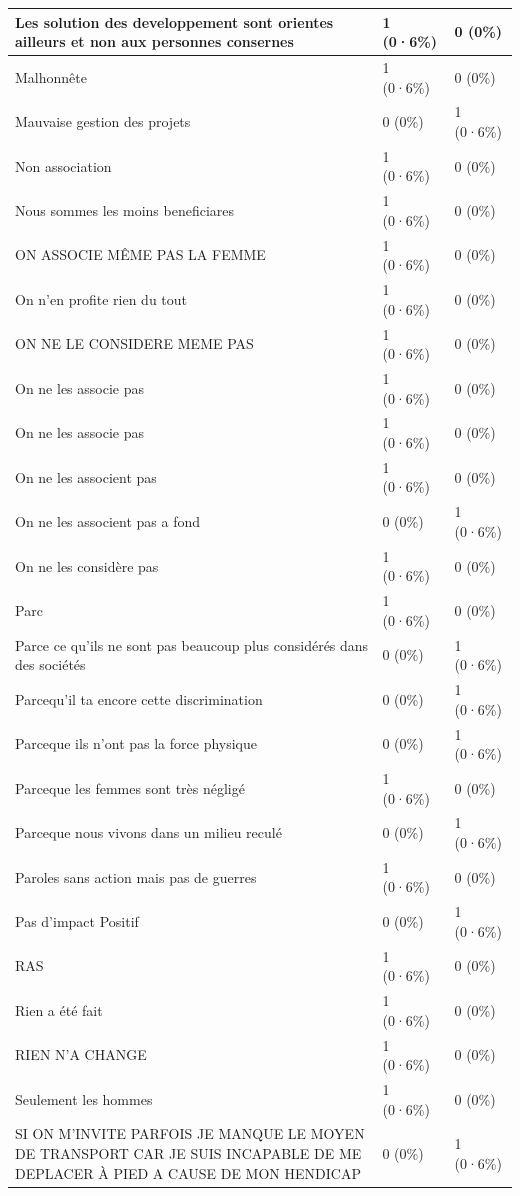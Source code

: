 \documentclass[
]{book}
\begin{document}
\begin{tabular}{l|l|l}
\hline
Les solution des developpement sont orientes ailleurs et non aux personnes consernes & 1 (0·6\%) & 0 (0\%)\\
\hline
Malhonnête & 1 (0·6\%) & 0 (0\%)\\
\hline
Mauvaise gestion des projets & 0 (0\%) & 1 (0·6\%)\\
\hline
Non association & 1 (0·6\%) & 0 (0\%)\\
\hline
Nous sommes les moins beneficiares & 1 (0·6\%) & 0 (0\%)\\
\hline
ON ASSOCIE MÊME PAS LA FEMME & 1 (0·6\%) & 0 (0\%)\\
\hline
On n'en profite rien du tout & 1 (0·6\%) & 0 (0\%)\\
\hline
ON NE LE CONSIDERE MEME PAS & 1 (0·6\%) & 0 (0\%)\\
\hline
On ne les associe  pas & 1 (0·6\%) & 0 (0\%)\\
\hline
On ne les associe pas & 1 (0·6\%) & 0 (0\%)\\
\hline
On ne les associent pas & 1 (0·6\%) & 0 (0\%)\\
\hline
On ne les associent pas a fond & 0 (0\%) & 1 (0·6\%)\\
\hline
On ne les considère pas & 1 (0·6\%) & 0 (0\%)\\
\hline
Parc & 1 (0·6\%) & 0 (0\%)\\
\hline
Parce ce qu'ils ne sont pas beaucoup plus considérés dans des sociétés & 0 (0\%) & 1 (0·6\%)\\
\hline
Parcequ'il ta encore cette discrimination & 0 (0\%) & 1 (0·6\%)\\
\hline
Parceque ils n'ont pas la force physique & 0 (0\%) & 1 (0·6\%)\\
\hline
Parceque les femmes sont très négligé & 1 (0·6\%) & 0 (0\%)\\
\hline
Parceque nous vivons dans un milieu reculé & 0 (0\%) & 1 (0·6\%)\\
\hline
Paroles sans action mais pas de guerres & 1 (0·6\%) & 0 (0\%)\\
\hline
Pas d'impact Positif & 0 (0\%) & 1 (0·6\%)\\
\hline
RAS & 1 (0·6\%) & 0 (0\%)\\
\hline
Rien a été fait & 1 (0·6\%) & 0 (0\%)\\
\hline
RIEN N'A CHANGE & 1 (0·6\%) & 0 (0\%)\\
\hline
Seulement les hommes & 1 (0·6\%) & 0 (0\%)\\
\hline
SI ON M'INVITE PARFOIS JE MANQUE LE MOYEN DE TRANSPORT CAR JE SUIS INCAPABLE DE ME DEPLACER À PIED A CAUSE DE MON HENDICAP & 0 (0\%) & 1 (0·6\%)\\

\end{tabular}
\end{document}
